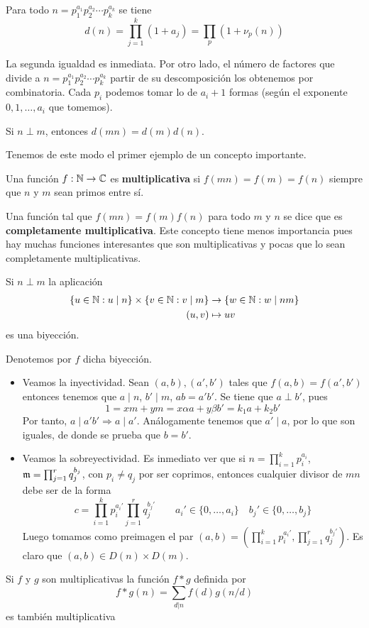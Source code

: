 \documentclass[TAN.tex]{subfiles}
\begin{document}
\begin{prop}
Para todo $n = p_1^{a_1}p_2^{a_2}\cdots p_k^{a_k}$ se tiene
\[ d(n) = \prod_{j=1}^k (1+a_j) = \prod_p (1+ν_p(n)) \]
\end{prop}
\begin{dem}
La segunda igualdad es inmediata. Por otro lado, el número de factores que divide a $n = p_1^{a_1}p_2^{a_2}\cdots p_k^{a_k}$  partir de su descomposición los obtenemos por combinatoria. Cada $p_i$ podemos tomar lo de $a_i+1$ formas (según el exponente $0,1,\dotsc,a_i$ que tomemos).
\end{dem}
\begin{coro}
Si $n \perp m$, entonces $d(mn) = d(m)d(n)$.
\end{coro}

Tenemos de este modo el primer ejemplo de un concepto importante.

\begin{defi}
Una función $f : \mathbb{N} \to \mathbb{C}$ es \textbf{multiplicativa} si $f(mn) = f(m)=f(n)$ siempre que $n$ y $m$ sean primos entre sí.

Una función tal que $f(mn)=f(m)f(n)$ para todo $m$ y $n$ se dice que es \textbf{completamente multiplicativa}.
Este concepto tiene menos importancia pues hay muchas funciones interesantes que son multiplicativas y pocas que lo sean completamente multiplicativas.
\end{defi}

\begin{prop}
Si $n \perp m$ la aplicación
\begin{align*}
	\{ u \in \mathbb{N} : u \mid n\} \times \{v \in \mathbb{N} : v \mid m\} & \rightarrow \{ w \in \mathbb{N} : w \mid nm \}\\
	(u,v) & \mapsto uv
\end{align*}
es una biyección.
\end{prop}
\begin{dem}
Denotemos por $f$ dicha biyección. 
\begin{itemize} 
\item Veamos la inyectividad. Sean $(a,b),(a',b')$ tales que $f(a,b)=f(a',b')$ entonces tenemos que $a\mid n$, $b'\mid m$, $ab=a'b'$. Se tiene que $a\perp b'$, pues
$$
1=xm+ym = x\alpha a + y\beta b' = k_1 a + k_2 b'
$$
Por tanto, $a\mid a'b' \Rightarrow a\mid a'$. Análogamente tenemos que $a'\mid a$, por lo que son iguales, de donde se prueba que $b=b'$. 
\item Veamos la sobreyectividad. Es inmediato ver que si $n=\prod_{i=1}^k p_i ^{a_i}$, ${\mathfrak{m}}=\prod_{j=1}^r q_j^{b_j}$, con $p_i \neq q_j$ por ser coprimos, entonces cualquier divisor de $mn$ debe ser de la forma
$$
c = \prod_{i=1}^k p_i ^{a_i'}\prod_{j=1}^r q_j^{b_j'} \qquad a_i' \in \{0,\dotsc,a_i\} \quad b_j' \in \{0,\dotsc,b_j\}
$$
Luego tomamos como preimagen el par $(a,b) = (\prod_{i=1}^k p_i ^{a_i'},\prod_{j=1}^r q_j^{b_j'})$. Es claro que $(a,b) \in D(n)\times D(m)$.
\end{itemize}
\end{dem}
\begin{prop} Si $f$ y $g$ son multiplicativas la función $f * g$ definida por
\[ f * g (n) = \sum_{d|n} f(d)g(n/d) \]
es también multiplicativa
\end{prop}
\end{document}
